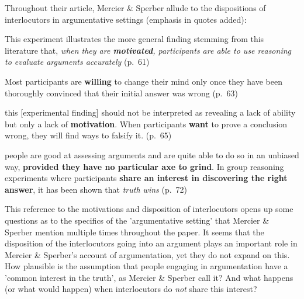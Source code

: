 Throughout their \citeyear{MS11} article, Mercier \& Sperber allude to the dispositions
of interlocutors in argumentative settings (emphasis in quotes added):
\begin{quoting}
    This experiment illustrates the more general finding stemming from this literature that, \emph{when they are \textbf{motivated}, participants are able to use reasoning to evaluate arguments accurately}
    \hfill (p.~61)
\end{quoting}
\begin{quoting}
    Most participants are \textbf{willing} to change their mind only once they have been thoroughly convinced that their initial answer was wrong
    \hfill (p.~63)
\end{quoting}
\begin{quoting}
    this [experimental finding] should not be interpreted as revealing a lack of ability but only a lack of \textbf{motivation}. When participants \textbf{want} to prove a conclusion wrong, they will find ways to falsify it.
    \hfill (p.~65)
\end{quoting}
\begin{quoting}
    people are good at assessing arguments and are quite able to do so in an unbiased way, \textbf{provided they have no particular axe to grind}. In group reasoning experiments where participants \textbf{share an interest in discovering the right answer}, it has been shown that \emph{truth wins}
    \hfill (p.~72)
\end{quoting}
This reference to the motivations and disposition of interlocutors opens up some questions as to the specifics of the 'argumentative setting' that Mercier \& Sperber mention multiple times throughout the paper. It seems that the disposition of the interlocutors going into an argument plays an important role in Mercier \& Sperber's account of argumentation, yet they do not expand on this.
How plausible is the assumption that people engaging in argumentation have a 'common interest in the truth', as Mercier \& Sperber call it? And what happens (or what would happen) when interlocutors do \emph{not} share this interest?

